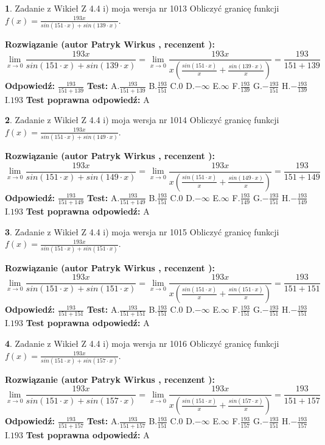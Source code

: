\documentclass[12pt, a4paper]{article}
\theoremstyle{definition} %
\newtheorem{zad}{}
\newcommand{\zadStart}[1]{\begin{zad}#1\newline}
\newcommand{\zadStop}{\end{zad}}
\newcommand{\rozwStart}[2]{\noindent \textbf{Rozwiązanie (autor #1 , recenzent #2): }\newline}
\newcommand{\rozwStop}{\newline}
\newcommand{\odpStart}{\noindent \textbf{Odpowiedź:}\newline}
\newcommand{\odpStop}{\newline}
\newcommand{\testStart}{\noindent \textbf{Test:}\newline}
\newcommand{\testStop}{\newline}
\newcommand{\kluczStart}{\noindent \textbf{Test poprawna odpowiedź:}\newline}
\newcommand{\kluczStop}{\newline}
\begin{document}
\zadStart{Zadanie z Wikieł Z 4.4 i) moja wersja nr 1013}
Obliczyć granicę funkcji $f(x)=\frac{193x}{sin(151\cdot x) +sin(139\cdot x)}$.
\zadStop
\rozwStart{Patryk Wirkus}{}
$$\lim\limits_{x\to 0}\frac{193x}{sin(151\cdot x) +sin(139\cdot x)}=\lim\limits_{x\to 0}\frac{193x}{x(\frac{sin(151\cdot x)}{x}+\frac{sin(139\cdot x)}{x})}=\frac{193}{151+139}$$
\rozwStop
\odpStart
$\frac{193}{151+139}$
\odpStop
\testStart
A.$\frac{193}{151+139}$
B.$\frac{193}{151}$
C.$0$
D.$-\infty$
E.$\infty$
F.$\frac{193}{139}$
G.$-\frac{193}{151}$
H.$-\frac{193}{139}$
I.$193$
\testStop
\kluczStart
A
\kluczStop



\zadStart{Zadanie z Wikieł Z 4.4 i) moja wersja nr 1014}
Obliczyć granicę funkcji $f(x)=\frac{193x}{sin(151\cdot x) +sin(149\cdot x)}$.
\zadStop
\rozwStart{Patryk Wirkus}{}
$$\lim\limits_{x\to 0}\frac{193x}{sin(151\cdot x) +sin(149\cdot x)}=\lim\limits_{x\to 0}\frac{193x}{x(\frac{sin(151\cdot x)}{x}+\frac{sin(149\cdot x)}{x})}=\frac{193}{151+149}$$
\rozwStop
\odpStart
$\frac{193}{151+149}$
\odpStop
\testStart
A.$\frac{193}{151+149}$
B.$\frac{193}{151}$
C.$0$
D.$-\infty$
E.$\infty$
F.$\frac{193}{149}$
G.$-\frac{193}{151}$
H.$-\frac{193}{149}$
I.$193$
\testStop
\kluczStart
A
\kluczStop



\zadStart{Zadanie z Wikieł Z 4.4 i) moja wersja nr 1015}
Obliczyć granicę funkcji $f(x)=\frac{193x}{sin(151\cdot x) +sin(151\cdot x)}$.
\zadStop
\rozwStart{Patryk Wirkus}{}
$$\lim\limits_{x\to 0}\frac{193x}{sin(151\cdot x) +sin(151\cdot x)}=\lim\limits_{x\to 0}\frac{193x}{x(\frac{sin(151\cdot x)}{x}+\frac{sin(151\cdot x)}{x})}=\frac{193}{151+151}$$
\rozwStop
\odpStart
$\frac{193}{151+151}$
\odpStop
\testStart
A.$\frac{193}{151+151}$
B.$\frac{193}{151}$
C.$0$
D.$-\infty$
E.$\infty$
F.$\frac{193}{151}$
G.$-\frac{193}{151}$
H.$-\frac{193}{151}$
I.$193$
\testStop
\kluczStart
A
\kluczStop



\zadStart{Zadanie z Wikieł Z 4.4 i) moja wersja nr 1016}
Obliczyć granicę funkcji $f(x)=\frac{193x}{sin(151\cdot x) +sin(157\cdot x)}$.
\zadStop
\rozwStart{Patryk Wirkus}{}
$$\lim\limits_{x\to 0}\frac{193x}{sin(151\cdot x) +sin(157\cdot x)}=\lim\limits_{x\to 0}\frac{193x}{x(\frac{sin(151\cdot x)}{x}+\frac{sin(157\cdot x)}{x})}=\frac{193}{151+157}$$
\rozwStop
\odpStart
$\frac{193}{151+157}$
\odpStop
\testStart
A.$\frac{193}{151+157}$
B.$\frac{193}{151}$
C.$0$
D.$-\infty$
E.$\infty$
F.$\frac{193}{157}$
G.$-\frac{193}{151}$
H.$-\frac{193}{157}$
I.$193$
\testStop
\kluczStart
A
\kluczStop
\end{document}
